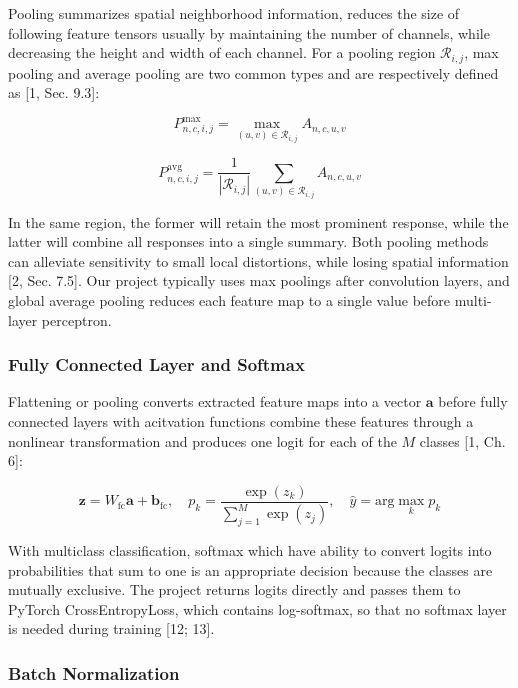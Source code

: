 Pooling summarizes spatial neighborhood information, reduces the size of following feature tensors usually by maintaining the number of channels, while decreasing the height and width of each channel. For a pooling region \({\mathcal{R}}_{i,j}\), max pooling and average pooling are two common types and are respectively defined as [1, Sec. 9.3]:

\[
{P}_{n,c,i,j}^{\max }={\max }_{(u,v)\in {\mathcal{R}}_{i,j}}{A}_{n,c,u,v}
\]

\[
{P}_{n,c,i,j}^{\mathrm{avg}}=\frac{1}{\left| {\mathcal{R}}_{i,j}\right| }\sum _{(u,v)\in {\mathcal{R}}_{i,j}} {A}_{n,c,u,v}
\]

In the same region, the former will retain the most prominent response, while the latter will combine all responses into a single summary. Both pooling methods can alleviate sensitivity to small local distortions, while losing spatial information [2, Sec. 7.5]. Our project typically uses max poolings after convolution layers, and global average pooling reduces each feature map to a single value before multi-layer perceptron.

\subsubsection{Fully Connected Layer and Softmax}\label{theory:2.2.5}

Flattening or pooling converts extracted feature maps into a vector \(\boldsymbol{a}\) before fully connected layers with acitvation functions combine these features through a nonlinear transformation and produces one logit for each of the \(M\) classes [1, Ch. 6]:

\[
\boldsymbol{z}={W}_{\mathrm{fc}}\boldsymbol{a}+{\boldsymbol{b}}_{\mathrm{fc}},\quad {p}_{k}=\frac{\exp ({z}_{k})}{\sum _{j=1}^{M} \exp ({z}_{j})},\quad \hat{y}=\mathrm{arg}{\max }_{k}{p}_{k}
\]

With multiclass classification, softmax which have ability to convert logits into probabilities that sum to one is an appropriate decision because the classes are mutually exclusive. The project returns logits directly and passes them to PyTorch CrossEntropyLoss, which contains log-softmax, so that no softmax layer is needed during training [12; 13].

\subsubsection{Batch Normalization}\label{theory:2.2.6}

